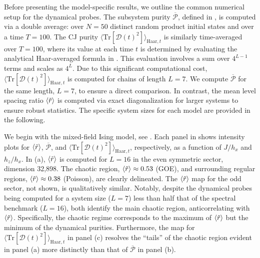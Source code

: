 \documentclass[letterpaper,superscriptaddress,aps,pra,nolongbibliography,showpacs,floatfix,dvipsnames,10pt,twocolumn]{revtex4-2}
\newcommand{\choip}{\langle \text{Tr}[\mathcal{D}(t)^2] \rangle_{\mathrm{Haar}, t}}
\newcommand{\statep}{\overline{\mathcal{P}}}
\newcommand{\mlsr}{\ev{\tilde{r}}}
\begin{document}
Before presenting the model-specific results, we outline the
common numerical setup for the dynamical probes. The subsystem
purity $\statep$, defined in , is computed
via a double average: over $N=50$ distinct random product
initial states and over a time $T=100$. The CJ purity
$\choip$ is similarly time-averaged over $T=100$, where its
value at each time $t$ is determined by evaluating the
analytical Haar-averaged formula in .
This evaluation involves a sum over $4^{L-1}$ terms and
scales as $4^L$. Due to this significant computational
cost, 
$\choip$ is computed for chains of length $L=7$.
We compute $\statep$ for the same length, $L=7$, to ensure a
direct comparison. In contrast, the
mean level spacing ratio $\expval{\tilde{r}}$ is computed via
exact diagonalization for larger systems to ensure robust
statistics. The specific system sizes for each model are
provided in the following.

We begin with the mixed-field Ising model, see .
Each panel in  shows intensity plots for
$\mlsr$, $\statep$, and $\choip$, respectively,
as a function of $J/h_x$ and $h_z / h_x$.
In (a), $\expval{\tilde{r}}$ is computed
for $L=16$ in the even symmetric sector, dimension 32,898.
The chaotic region, $\expval{\tilde{r}} \approx 0.53$ (GOE), and
surrounding regular regions, $\expval{\tilde{r}} \approx 0.38$
(Poisson), are clearly delineated. The $\ev{\tilde{r}}$ map for
the odd sector, not shown, is qualitatively similar.
Notably, despite the dynamical probes being computed for a
system size ($L=7$) less than half that of the spectral
benchmark ($L=16$), both identify the main chaotic region,
anticorrelating with $\expval{\tilde{r}}$. Specifically, the
chaotic regime corresponds to the maximum of $\expval{\tilde{r}}$
but the minimum of the dynamical purities. Furthermore, the map for
$\choip$ in panel (c) resolves the ``tails'' of the
chaotic region evident in panel (a) more distinctly than
that of $\statep$ in panel (b).
\end{document}
